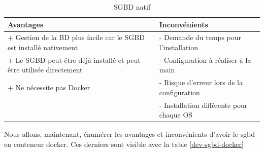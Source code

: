 \documentclass[
    iai, %
    il, %
]{heig-tb}
\begin{document}
\begin{table}[h]
    \begin{center}
        \caption{SGBD natif \label{dev-sgbd-native}}
        \begin{tabularx}{1.0\textwidth} {X|X}
            Avantages                                                           & Inconvénients \\ \hline
            + Gestion de la BD plus facile car le SGBD est installé nativement  &
            - Demande du temps pour l'installation                                              \\
            + Le SGBD peut-être déjà installé et peut être utilisée directement &
            - Configuration à réaliser à la main                                                \\
            + Ne nécessite pas Docker                                           &
            - Risque d'erreur lors de la configuration                                          \\             & - Installation différente pour chaque OS                                                                    \\
        \end{tabularx}
    \end{center}
\end{table}

Nous allons, maintenant, énumérer les avantages et inconvénients d'avoir le \Gls{sgbd} en \Gls{conteneur}
\Gls{docker}. Ces derniers sont visible avec la table \ref{dev-sgbd-docker}
\end{document}
